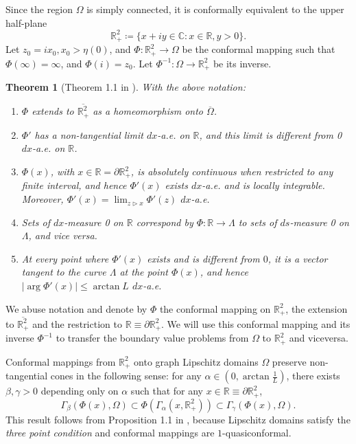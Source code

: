 \documentclass[12pt]{amsart}
\newcommand{\R}{\mathbb{R}}
\newcommand{\C}{\mathbb{C}}
\theoremstyle{plain}
\newtheorem{theorem}{Theorem}[section]
\theoremstyle{definition}
\numberwithin{equation}{section}
\begin{document}
Since the region $\Omega$ is simply connected, it is conformally equivalent to the upper half-plane
\[
\R_{+}^{2}
\coloneqq 
\{
x+iy\in\C: x\in\R, y>0
\}.
\]
Let $z_0=i x_0, x_0>\eta(0)$, and $\Phi: \R_{+}^{2} \rightarrow \Omega$ be the conformal mapping such that $\Phi(\infty)=\infty$, and $\Phi(i)=z_0$. Let $\Phi^{-1}: \Omega \rightarrow \R_{+}^{2}$ be its inverse.

\begin{theorem}[Theorem 1.1 in \cite{kenigWeighted}]\label{thm:thm1.1_Kenig}
With the above notation:
\begin{enumerate}
    \item $\Phi$ extends to $\overline{\R_{+}^{2}}$ as a homeomorphism onto $\overline{\Omega}$.
    \item $\Phi'$ has a non-tangential limit $dx$-a.e. on $\R$, and this limit is different from 0 $dx$-a.e. on $\R$.
    \item $\Phi(x)$, with $x\in\R=\partial\R_{+}^{2}$, is absolutely continuous when restricted to any finite interval, and hence $\Phi'(x)$ exists $dx$-a.e. and is locally integrable. Moreover, $\Phi'(x)=\lim_{z\triangleright x} \Phi'(z)$ $dx$-a.e.
    \item Sets of $dx$-measure 0 on $\R$ correspond by $\Phi\colon \R\to\Lambda$ to sets of $ds$-measure 0 on $\Lambda$, and vice versa.
    \item At every point where $\Phi'(x)$ exists and is different from $0$, it is a vector tangent to the curve $\Lambda$ at the point $\Phi(x)$, and hence $|\arg \Phi'(x)|\leq \arctan{L}$ $dx$-a.e.
\end{enumerate}    
\end{theorem}



We abuse notation and denote by $\Phi$ the conformal mapping on $\R_{+}^{2}$, the extension to $\overline{\R_{+}^{2}}$ and the restriction to $\R\equiv \partial\R_{+}^{2}$. We will use this conformal mapping and its inverse $\Phi^{-1}$ to transfer the boundary value problems from $\Omega$ to $\R_{+}^{2}$ and viceversa. 

Conformal mappings from $\R_{+}^{2}$ onto graph Lipschitz domains $\Omega$ preserve non-tangential cones in the following sense: for any $\alpha\in (0,\arctan{\frac{1}{L}})$, there exists $\beta,\gamma>0$ depending only on $\alpha$ such that for any $x\in\R\equiv \partial\R_{+}^{2}$, 
\begin{equation} \label{eq:thm1.1_JerisonKenig}
    \Gamma_{\beta}(\Phi(x),\Omega)
    \subset
    \Phi(\Gamma_{\alpha}(x,\R_{+}^{2}))
    \subset 
    \Gamma_{\gamma}(\Phi(x),\Omega).
\end{equation}
This result follows from  Proposition 1.1 in \cite{jerisonKenig}, because Lipschitz domains satisfy the \textit{three point condition} and conformal mappings are $1$-quasiconformal.
\end{document}
